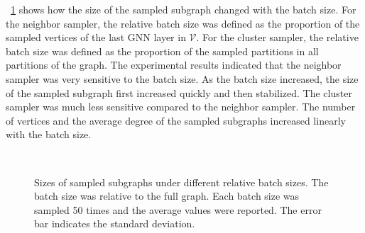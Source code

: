 \figurename~\ref{fig:exp_sampling_minibatch_graph_info} shows how the size of the sampled subgraph changed with the batch size.
%
For the neighbor sampler, the relative batch size was defined as the proportion of the sampled vertices of the last GNN layer in $\mathcal{V}$.
%
For the cluster sampler, the relative batch size was defined as the proportion of the sampled partitions in all partitions of the graph.
%
The experimental results indicated that the neighbor sampler was very sensitive to the batch size.
%
As the batch size increased, the size of the sampled subgraph first increased quickly and then stabilized.
%
The cluster sampler was much less sensitive compared to the neighbor sampler.
%
The number of vertices and the average degree of the sampled subgraphs increased linearly with the batch size.

\begin{figure}[H]
    \centering
     \\
    \caption{Sizes of sampled subgraphs under different relative batch sizes. The batch size was relative to the full graph. Each batch size was sampled 50 times and the average values were reported. The error bar indicates the standard deviation.}
    \label{fig:exp_sampling_minibatch_graph_info}
\end{figure}

